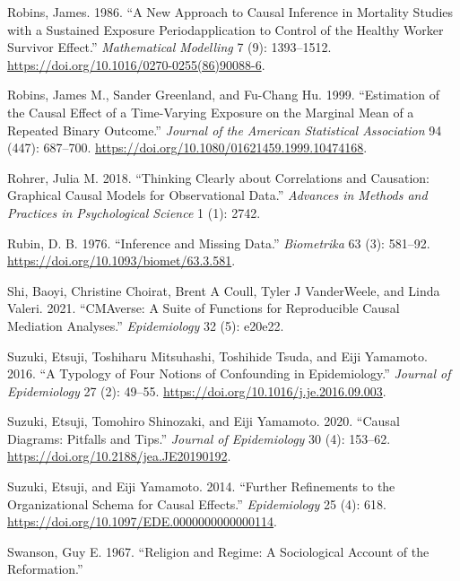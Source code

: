 \documentclass[
  singlecolumn]{article}
\newlength{\cslhangindent}
\newlength{\cslentryspacingunit} %
\newenvironment{CSLReferences}[2] %
 {%
  \setlength{\parindent}{0pt}
  \ifodd #1
  \let\oldpar\par
  \def\par{\hangindent=\cslhangindent\oldpar}
  \fi
  \setlength{\parskip}{#2\cslentryspacingunit}
 }%
 {}
\begin{document}
\begin{CSLReferences}{1}{0}
\leavevmode{}%
Robins, James. 1986. {``A New Approach to Causal Inference in Mortality
Studies with a Sustained Exposure Period{\textemdash}application to
Control of the Healthy Worker Survivor Effect.''} \emph{Mathematical
Modelling} 7 (9): 1393--1512.
\url{https://doi.org/10.1016/0270-0255(86)90088-6}.

\leavevmode{}%
Robins, James M., Sander Greenland, and Fu-Chang Hu. 1999. {``Estimation
of the Causal Effect of a Time-Varying Exposure on the Marginal Mean of
a Repeated Binary Outcome.''} \emph{Journal of the American Statistical
Association} 94 (447): 687--700.
\url{https://doi.org/10.1080/01621459.1999.10474168}.

\leavevmode{}%
Rohrer, Julia M. 2018. {``Thinking Clearly about Correlations and
Causation: Graphical Causal Models for Observational Data.''}
\emph{Advances in Methods and Practices in Psychological Science} 1 (1):
2742.

\leavevmode{}%
Rubin, D. B. 1976. {``Inference and Missing Data.''} \emph{Biometrika}
63 (3): 581--92. \url{https://doi.org/10.1093/biomet/63.3.581}.

\leavevmode{}%
Shi, Baoyi, Christine Choirat, Brent A Coull, Tyler J VanderWeele, and
Linda Valeri. 2021. {``CMAverse: A Suite of Functions for Reproducible
Causal Mediation Analyses.''} \emph{Epidemiology} 32 (5): e20e22.

\leavevmode{}%
Suzuki, Etsuji, Toshiharu Mitsuhashi, Toshihide Tsuda, and Eiji
Yamamoto. 2016. {``A Typology of Four Notions of Confounding in
Epidemiology.''} \emph{Journal of Epidemiology} 27 (2): 49--55.
\url{https://doi.org/10.1016/j.je.2016.09.003}.

\leavevmode{}%
Suzuki, Etsuji, Tomohiro Shinozaki, and Eiji Yamamoto. 2020. {``Causal
Diagrams: Pitfalls and Tips.''} \emph{Journal of Epidemiology} 30 (4):
153--62. \url{https://doi.org/10.2188/jea.JE20190192}.

\leavevmode{}%
Suzuki, Etsuji, and Eiji Yamamoto. 2014. {``Further Refinements to the
Organizational Schema for Causal Effects.''} \emph{Epidemiology} 25 (4):
618. \url{https://doi.org/10.1097/EDE.0000000000000114}.

\leavevmode{}%
Swanson, Guy E. 1967. {``Religion and Regime: A Sociological Account of
the Reformation.''}


\end{CSLReferences}
\end{document}
